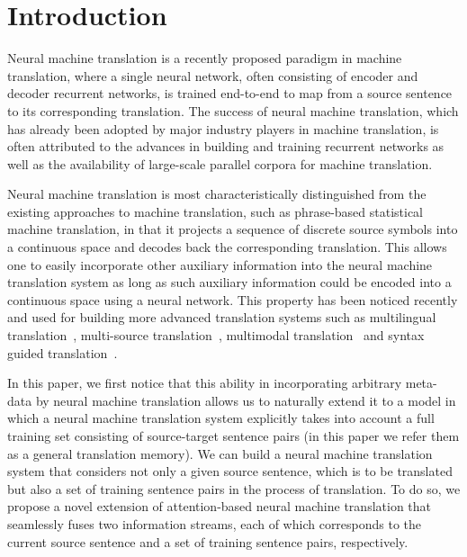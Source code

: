 \section{Introduction}

Neural machine translation is a recently proposed paradigm in machine translation, where a single neural network, often consisting of encoder and decoder recurrent networks, is trained end-to-end to map from a source sentence to its corresponding translation\citep{bahdanau2014neural,cho2014learning,sutskever2014sequence,kalchbrenner2013recurrent}. The success of neural machine translation, which has already been adopted by major industry players in machine translation\citep{wu2016google,crego2016systran}, is often attributed to the advances in building and training recurrent networks as well as the availability of large-scale parallel corpora for machine translation. 

Neural machine translation is most characteristically distinguished from the existing approaches to machine translation, such as phrase-based statistical machine translation\citep{koehn2003statistical}, in that it projects a sequence of discrete source symbols into a continuous space and decodes back the corresponding translation. This allows one to easily incorporate other auxiliary information into the neural machine translation system as long as such auxiliary information could be encoded into a continuous space using a neural network. This property has been noticed recently and used for building more advanced translation systems such as multilingual translation~\citep{firat2016multi,luong2015multi}, multi-source translation~\citep{zoph2016multi,firat2016zero}, multimodal translation~\citep{caglayan2016does} and syntax guided translation~\citep{nadejde2017syntax,eriguchi2017learning}. 

In this paper, we first notice that this ability in incorporating arbitrary meta-data by neural machine translation allows us to naturally extend it to a %
model in which a neural machine translation system explicitly takes into account a full training set consisting of source-target sentence pairs (in this paper we refer them as a general translation memory). We can build a neural machine translation system that considers not only a given source sentence, which is to be translated but also a set of training sentence pairs in the process of translation. To do so, we propose a novel extension of attention-based neural machine translation that seamlessly fuses two information streams, each of which corresponds to the current source sentence and a set of training sentence pairs, respectively. 

